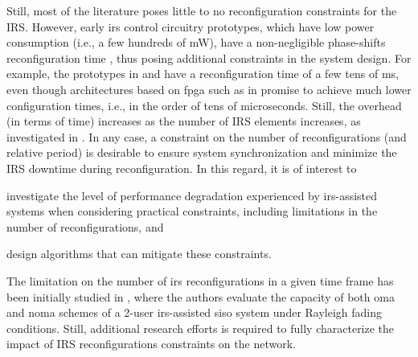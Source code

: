 Still, most of the literature poses little to no reconfiguration constraints for the IRS.
However, early \gls{irs} control circuitry prototypes, which have low power consumption (i.e., a few hundreds of mW), have a non-negligible phase-shifts reconfiguration time \cite{mu2021capacity, ETSIGRRIS003}, thus posing additional constraints in the system design. For example, the prototypes in \cite{rossanese2022designing} and \cite{alexandropoulos2023ris} have a reconfiguration time of a few tens of ms, even though architectures based on \gls{fpga} such as in \cite{yezhen2020novel} promise to achieve much lower configuration times, i.e., in the order of tens of microseconds.
Still, the overhead (in terms of time) increases as the number of IRS elements increases, as investigated in \cite{jamali2022low, nadeem2020asymptotic, Qian22joint}. 
In any case, a constraint on the number of reconfigurations (and relative period) is desirable to ensure system synchronization and minimize the IRS downtime during reconfiguration. In this regard, it is of interest to 
\begin{enumerate*}[label=(\textit{\roman*})]
  \item investigate the level of performance degradation experienced by \gls{irs}-assisted systems when considering practical constraints, including limitations in the number of reconfigurations, and
  \item design algorithms that can mitigate these constraints. 
\end{enumerate*}
The limitation on the number of \gls{irs} reconfigurations in a given time frame has been initially studied in \cite{mu2021capacity}, where the authors evaluate the capacity of both \gls{oma} and \gls{noma} schemes of a 2-user \gls{irs}-assisted \gls{siso} system under Rayleigh fading conditions. Still, additional research efforts is required to fully characterize the impact of IRS reconfigurations constraints on the network.

